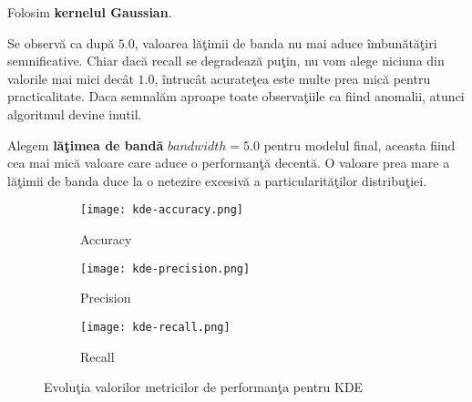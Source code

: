 Folosim \textbf{kernelul Gaussian}.

Se observă ca după $5.0$, valoarea lăţimii de banda nu mai aduce îmbunătăţiri 
semnificative. Chiar dacă recall se degradează puţin, nu vom alege niciuna din 
valorile mai mici decât $1.0$, întrucât acurateţea este multe prea mică pentru 
practicalitate. Daca semnalăm aproape toate observaţiile ca fiind anomalii, atunci 
algoritmul devine inutil.

Alegem \textbf{lăţimea de bandă} $bandwidth=5.0$ pentru modelul final, aceasta fiind cea mai mică valoare 
care aduce o performanţă decentă. O valoare prea mare a lăţimii de banda duce 
la o netezire excesivă a particularităţilor distribuţiei.


\begin{figure}[htbp]
    \begin{minipage}{0.5\textwidth}
      \begin{subfigure}{\linewidth}
        \texttt{[image: kde-accuracy.png]}
        \caption{Accuracy}
      \end{subfigure}
      
      \vspace{1em}
      
      \begin{subfigure}{\linewidth}
        \texttt{[image: kde-precision.png]}
        \caption{Precision}
      \end{subfigure}
    \end{minipage}%
    \begin{minipage}{0.5\textwidth}
      \begin{subfigure}{\linewidth}
        \texttt{[image: kde-recall.png]}
        \caption{Recall}
      \end{subfigure}
    \end{minipage}
    
    \caption{Evoluţia valorilor metricilor de performanţa pentru KDE}
\end{figure}

